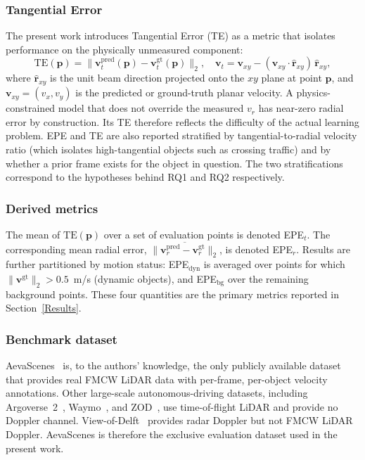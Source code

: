 \documentclass[a4paper,12pt]{article}
\begin{document}
\subsubsection{Tangential Error}

The present work introduces Tangential Error (TE) as a metric that isolates performance on the physically unmeasured component:
\begin{equation}
    \mathrm{TE}(\mathbf{p}) = \bigl\| \mathbf{v}_t^{\mathrm{pred}}(\mathbf{p}) - \mathbf{v}_t^{\mathrm{gt}}(\mathbf{p}) \bigr\|_2, \quad \mathbf{v}_t = \mathbf{v}_{xy} - (\mathbf{v}_{xy} \cdot \hat{\mathbf{r}}_{xy})\,\hat{\mathbf{r}}_{xy},
    \label{eq:tangential_error}
\end{equation}
where $\hat{\mathbf{r}}_{xy}$ is the unit beam direction projected onto the $xy$ plane at point $\mathbf{p}$, and $\mathbf{v}_{xy} = (v_x, v_y)$ is the predicted or ground-truth planar velocity. A physics-constrained model that does not override the measured $v_r$ has near-zero radial error by construction. Its TE therefore reflects the difficulty of the actual learning problem. EPE and TE are also reported stratified by tangential-to-radial velocity ratio (which isolates high-tangential objects such as crossing traffic) and by whether a prior frame exists for the object in question. The two stratifications correspond to the hypotheses behind RQ1 and RQ2 respectively.

\subsubsection{Derived metrics}

The mean of $\mathrm{TE}(\mathbf{p})$ over a set of evaluation points is denoted EPE$_t$. The corresponding mean radial error, $\overline{\|\mathbf{v}_r^{\mathrm{pred}} - \mathbf{v}_r^{\mathrm{gt}}\|_2}$, is denoted EPE$_r$. Results are further partitioned by motion status: EPE$_\mathrm{dyn}$ is averaged over points for which $\|\mathbf{v}^{\mathrm{gt}}\|_2 > 0.5$~m/s (dynamic objects), and EPE$_\mathrm{bg}$ over the remaining background points. These four quantities are the primary metrics reported in Section~\ref{Results}.

\subsubsection{Benchmark dataset}

AevaScenes~\cite{aeva2025aevascenes} is, to the authors' knowledge, the only publicly available dataset that provides real FMCW LiDAR data with per-frame, per-object velocity annotations. Other large-scale autonomous-driving datasets, including Argoverse~2~\cite{wilson2023argoverse2}, Waymo~\cite{sun2020waymo}, and ZOD~\cite{alibeigi2023zod}, use time-of-flight LiDAR and provide no Doppler channel. View-of-Delft~\cite{palffy2022vod} provides radar Doppler but not FMCW LiDAR Doppler. AevaScenes is therefore the exclusive evaluation dataset used in the present work.
\end{document}
